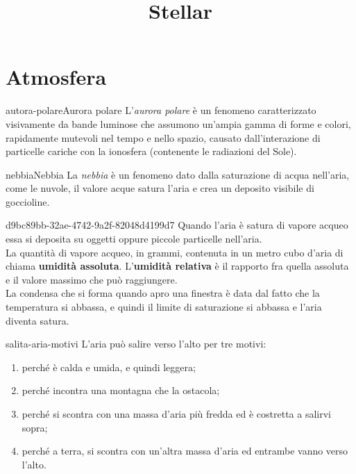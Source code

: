 \documentclass[preview]{standalone}
\begin{document}
\title{Stellar}
\genpage

\section{Atmosfera}

\begin{snippetdefinition}{autora-polare}{Aurora polare}
    L'\textit{aurora polare} è un fenomeno
    caratterizzato visivamente da bande luminose che assumono un'ampia gamma di forme e colori, rapidamente mutevoli nel tempo e nello spazio,
    causato dall'interazione di particelle cariche con la ionosfera (contenente le radiazioni del Sole).
\end{snippetdefinition}



\begin{snippetdefinition}{nebbia}{Nebbia}
    La \textit{nebbia} è un fenomeno dato dalla saturazione di acqua nell'aria,
    come le nuvole, il valore acque satura l'aria e crea un deposito visibile di goccioline.
\end{snippetdefinition}

\begin{snippet}{d9bc89bb-32ae-4742-9a2f-82048d4199d7}
    Quando l'aria è satura di vapore acqueo essa si deposita su oggetti oppure piccole particelle nell'aria.
    \\
    La quantità di vapore acqueo, in grammi, contenuta in un metro cubo d'aria di chiama \textbf{umidità assoluta}.
    L'\textbf{umidità relativa} è il rapporto fra quella assoluta e il valore massimo che può raggiungere.
    \\    
    La condensa che si forma quando apro una finestra è data dal fatto che la temperatura si abbassa, e quindi
    il limite di saturazione si abbassa e l'aria diventa satura.
\end{snippet}

\begin{snippet}{salita-aria-motivi}
    L'aria può salire verso l'alto per tre motivi:
    \begin{enumerate}
        \item perché è calda e umida, e quindi leggera;
        \item perché incontra una montagna che la ostacola;
        \item perché si scontra con una massa d'aria più fredda ed è costretta a salirvi sopra;
        \item perché a terra, si scontra con un'altra massa d'aria ed entrambe vanno verso l'alto.
    \end{enumerate}
\end{snippet}
\end{document}
